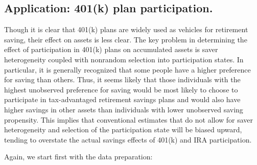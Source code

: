 \documentclass[12pt,a4paper]{article}
\begin{document}
\subsection{Application: 401(k) plan participation.}
Though it is clear that 401(k) plans are widely used as vehicles for retirement saving, their effect on assets is less clear. The key problem in determining the effect of participation in 401(k) plans on accumulated assets is saver heterogeneity coupled with nonrandom selection into participation states. In particular, it is generally recognized that some people have a higher preference for saving than others. Thus, it seems likely that those individuals with the highest unobserved preference for saving would be most likely to choose to participate in tax-advantaged retirement savings plans and would also have higher savings in other assets than individuals with lower unobserved saving propensity. This implies that conventional estimates that do not allow for saver heterogeneity and selection of the participation state will be biased upward, tending to overstate the actual savings effects of 401(k) and IRA participation.

Again, we start first with the data preparation:
\end{document}
